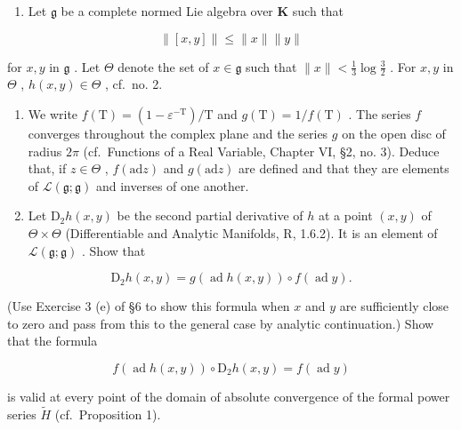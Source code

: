 
\begin{enumerate}
\def\labelenumi{\arabic{enumi}.}
\tightlist
\item
  Let \(\mathfrak{g}\) be a complete normed Lie algebra over \(\mathbf{K}\) such that
\end{enumerate}

\[
\| [ x, y ] \| \leqslant \| x \| \| y \|
\]

for \(x, y\) in \(\mathfrak{g}\) . Let \(\Theta\) denote the set of \(x \in \mathfrak{g}\) such that \(\| x \| < \frac{1}{3} \log \frac{3}{2}\) . For \(x, y\) in \(\Theta\) , \(h(x, y) \in \Theta\) , cf.~no. 2.

\begin{enumerate}
\def\labelenumi{(\alph{enumi})}
\item
  We write \(f(\mathrm{T}) = (1 - \varepsilon^{-\mathrm{T}}) / \mathrm{T}\) and \(g(\mathrm{T}) = 1 / f(\mathrm{T})\) . The series \(f\) converges throughout the complex plane and the series \(g\) on the open disc of radius \(2\pi\) (cf.~Functions of a Real Variable, Chapter VI, §2, no. 3). Deduce that, if \(z \in \Theta\) , \(f(\mathrm{ad}z)\) and \(g(\mathrm{ad}z)\) are defined and that they are elements of \(\mathcal{L}(\mathfrak{g};\mathfrak{g})\) and inverses of one another.
\item
  Let \(\mathrm{D}_2h(x,y)\) be the second partial derivative of \(h\) at a point \((x,y)\) of \(\Theta \times \Theta\) (Differentiable and Analytic Manifolds, R, 1.6.2). It is an element of \(\mathcal{L}(\mathfrak{g};\mathfrak{g})\) . Show that
\end{enumerate}

\[
\mathrm{D} _ {2} h (x, y) = g (\operatorname{ad} h (x, y)) \circ f (\operatorname{ad} y).
\]

(Use Exercise 3 (e) of §6 to show this formula when \(x\) and \(y\) are sufficiently close to zero and pass from this to the general case by analytic continuation.) Show that the formula

\[
f (\operatorname{ad} h (x, y)) \circ \mathrm{D} _ {2} h (x, y) = f (\operatorname{ad} y)
\]

is valid at every point of the domain of absolute convergence of the formal power series \(\tilde{H}\) (cf.~Proposition 1).

